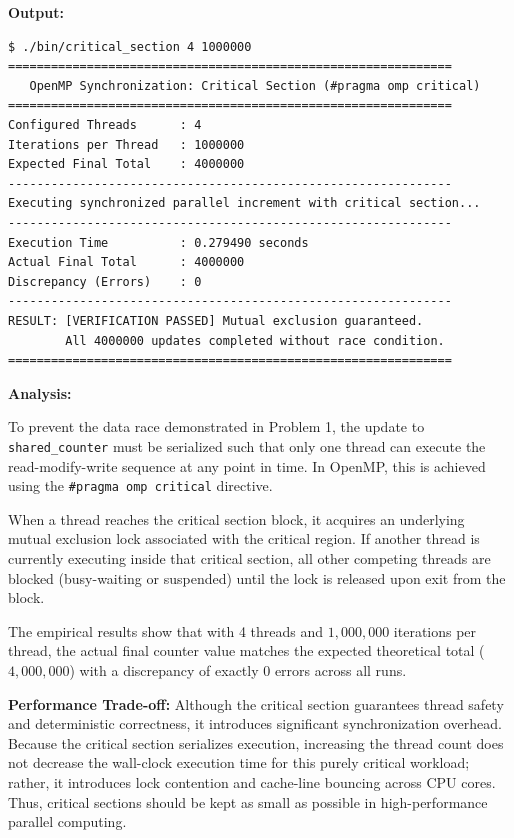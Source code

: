 \documentclass[12pt]{article}
\begin{document}
\textbf{Output:}

\begin{lstlisting}[style=output]
$ ./bin/critical_section 4 1000000
==============================================================
   OpenMP Synchronization: Critical Section (#pragma omp critical)
==============================================================
Configured Threads      : 4
Iterations per Thread   : 1000000
Expected Final Total    : 4000000
--------------------------------------------------------------
Executing synchronized parallel increment with critical section...
--------------------------------------------------------------
Execution Time          : 0.279490 seconds
Actual Final Total      : 4000000
Discrepancy (Errors)    : 0
--------------------------------------------------------------
RESULT: [VERIFICATION PASSED] Mutual exclusion guaranteed.
        All 4000000 updates completed without race condition.
==============================================================
\end{lstlisting}

\textbf{Analysis:}

To prevent the data race demonstrated in Problem 1, the update to \texttt{shared\_counter} must be serialized such that only one thread can execute the read-modify-write sequence at any point in time. In OpenMP, this is achieved using the \texttt{\#pragma omp critical} directive.

When a thread reaches the critical section block, it acquires an underlying mutual exclusion lock associated with the critical region. If another thread is currently executing inside that critical section, all other competing threads are blocked (busy-waiting or suspended) until the lock is released upon exit from the block.

The empirical results show that with 4 threads and $1{,}000{,}000$ iterations per thread, the actual final counter value matches the expected theoretical total ($4{,}000{,}000$) with a discrepancy of exactly 0 errors across all runs.

\textbf{Performance Trade-off:} Although the critical section guarantees thread safety and deterministic correctness, it introduces significant synchronization overhead. Because the critical section serializes execution, increasing the thread count does not decrease the wall-clock execution time for this purely critical workload; rather, it introduces lock contention and cache-line bouncing across CPU cores. Thus, critical sections should be kept as small as possible in high-performance parallel computing.
\end{document}
